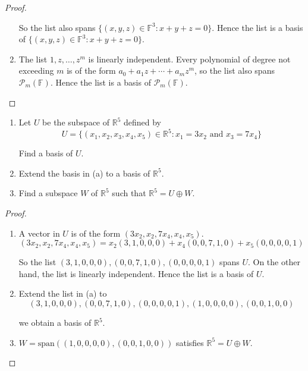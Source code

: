 \begin{proof}
\begin{enumerate}[label={(\alph*)}]
              So the list also spans $\{ (x, y, z)\in\mathbb{F}^{3}: x + y + z = 0 \}$. Hence the list is a basis of $\{ (x, y, z)\in\mathbb{F}^{3}: x + y + z = 0 \}$.
        \item The list $1, z, \ldots, z^{m}$ is linearly independent. Every polynomial of degree not exceeding $m$ is of the form $a_{0} + a_{1}z + \cdots + a_{m}z^{m}$, so the list also spans $\mathcal{P}_{m}(\mathbb{F})$. Hence the list is a basis of $\mathcal{P}_{m}(\mathbb{F})$.
    \end{enumerate}
\end{proof}

\begin{exercise}
    \begin{enumerate}[label={(\alph*)}]
        \item Let $U$ be the subspace of $\mathbb{R}^{5}$ defined by
              \[
                  U = \{ (x_{1}, x_{2}, x_{3}, x_{4}, x_{5})\in\mathbb{R}^{5}: x_{1} = 3x_{2} \text{ and } x_{3} = 7x_{4} \}
              \]

              Find a basis of $U$.
        \item Extend the basis in (a) to a basis of $\mathbb{R}^{5}$.
        \item Find a subspace $W$ of $\mathbb{R}^{5}$ such that $\mathbb{R}^{5} = U\oplus W$.
    \end{enumerate}
\end{exercise}

\begin{proof}
    \begin{enumerate}[label={(\alph*)}]
        \item A vector in $U$ is of the form $(3x_{2}, x_{2}, 7x_{4}, x_{4}, x_{5})$.
              \[
                  (3x_{2}, x_{2}, 7x_{4}, x_{4}, x_{5}) = x_{2}(3, 1, 0, 0, 0) + x_{4}(0, 0, 7, 1, 0) + x_{5}(0, 0, 0, 0, 1)
              \]

              So the list $(3, 1, 0, 0, 0), (0, 0, 7, 1, 0), (0, 0, 0, 0, 1)$ spans $U$. On the other hand, the list is linearly independent. Hence the list is a basis of $U$.
        \item Extend the list in (a) to
              \[
                  (3, 1, 0, 0, 0), (0, 0, 7, 1, 0), (0, 0, 0, 0, 1), (1, 0, 0, 0, 0), (0, 0, 1, 0, 0)
              \]

              we obtain a basis of $\mathbb{R}^{5}$.
        \item $W = \text{span}((1, 0, 0, 0, 0), (0, 0, 1, 0, 0))$ satisfies $\mathbb{R}^{5} = U\oplus W$.
    \end{enumerate}
\end{proof}

